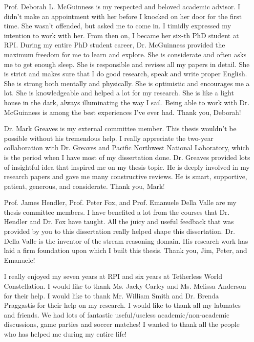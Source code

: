 Prof. Deborah L. McGuinness is my respected and beloved academic advisor. 
I didn't make an appointment with her before I knocked on her door for the first time. 
She wasn't offended, but asked me to come in. 
I timidly expressed my intention to work with her. 
From then on, I became her six-th PhD student at RPI.
During my entire PhD student career, Dr. McGuinness provided the maximum freedom for me to learn and explore.
She is considerate and often asks me to get enough sleep.
She is responsible and revises all my papers in detail.
She is strict and makes sure that I do good research, speak and write proper English.
She is strong both mentally and physically. 
She is optimistic and encourages me a lot. 
She is knowledgeable and helped a lot for my research. 
She is like a light house in the dark, always illuminating the way I sail.
Being able to work with Dr. McGuinness is among the best experiences I've ever had.
Thank you, Deborah!

Dr. Mark Greaves is my external committee member. 
This thesis wouldn't be possible without his tremendous help. 
I really appreciate the two-year collaboration with Dr. Greaves and Pacific Northwest National Laboratory, which is the period when I have most of my dissertation done.
Dr. Greaves provided lots of insightful idea that inspired me on my thesis topic. 
He is deeply involved in my research papers and gave me many constructive reviews.
He is smart, supportive, patient, generous, and considerate.
Thank you, Mark!

Prof. James Hendler, Prof. Peter Fox, and Prof. Emanuele Della Valle are my thesis committee members. 
I have benefited a lot from the courses that Dr. Hendler and Dr. Fox have taught.
All the juicy and useful feedback that was provided by you to this dissertation really helped shape this dissertation.
Dr. Della Valle is the inventor of the stream reasoning domain.
His research work has laid a firm foundation upon which I built this thesis.
Thank you, Jim, Peter, and Emanuele!

I really enjoyed my seven years at RPI and six years at Tetherless World Constellation. 
I would like to thank Ms. Jacky Carley and Ms. Melissa Anderson for their help.
I would like to thank Mr. William Smith and Dr. Brenda Praggastis for their help on my research.
I would like to thank all my labmates and friends. 
We had lots of fantastic useful/useless academic/non-academic discussions, game parties and soccer matches!
I wanted to thank all the people who has helped me during my entire life!

